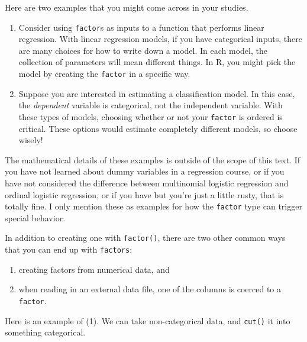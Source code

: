 \documentclass[
  12pt,
  krantz2]{krantz}
\providecommand{\tightlist}{%
  \setlength{\itemsep}{0pt}\setlength{\parskip}{0pt}}
\begin{document}
Here are two examples that you might come across in your studies.

\begin{enumerate}
\def\labelenumi{\arabic{enumi}.}
\item
  Consider using \texttt{factor}s as inputs to a function that performs linear regression. With linear regression models, if you have categorical inputs, there are many choices for how to write down a model. In each model, the collection of parameters will mean different things. In R, you might pick the model by creating the \texttt{factor} in a specific way.
\item
  Suppose you are interested in estimating a classification model. In this case, the \emph{dependent} variable is categorical, not the independent variable. With these types of models, choosing whether or not your \texttt{factor} is ordered is critical. These options would estimate completely different models, so choose wisely!
\end{enumerate}

The mathematical details of these examples is outside of the scope of this text. If you have not learned about dummy variables in a regression course, or if you have not considered the difference between multinomial logistic regression and ordinal logistic regression, or if you have but you're just a little rusty, that is totally fine. I only mention these as examples for how the \texttt{factor} type can trigger special behavior.

In addition to creating one with \texttt{factor()}, there are two other common ways that you can end up with \texttt{factors}:

\begin{enumerate}
\def\labelenumi{\arabic{enumi}.}
\tightlist
\item
  creating factors from numerical data, and
\item
  when reading in an external data file, one of the columns is coerced to a \texttt{factor}.
\end{enumerate}

Here is an example of (1). We can take non-categorical data, and \texttt{cut()} it into something categorical.
\end{document}
